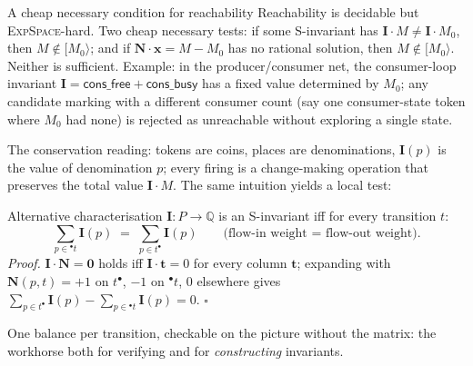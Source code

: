 \begin{notebox}{A cheap necessary condition for reachability}
Reachability is decidable but \textsc{ExpSpace}-hard. Two cheap necessary tests: if some S-invariant has $\mathbf{I} \cdot M \neq \mathbf{I} \cdot M_0$, then $M \notin [M_0\rangle$; and if $\mathbf{N} \cdot \mathbf{x} = M - M_0$ has no rational solution, then $M \notin [M_0\rangle$. Neither is sufficient. Example: in the producer/consumer net, the consumer-loop invariant $\mathbf{I} = \textsf{cons\_free} + \textsf{cons\_busy}$ has a fixed value determined by $M_0$; any candidate marking with a different consumer count (say one consumer-state token where $M_0$ had none) is rejected as unreachable without exploring a single state.
\end{notebox}

The conservation reading: tokens are coins, places are denominations, $\mathbf{I}(p)$ is the value of denomination $p$; every firing is a change-making operation that preserves the total value $\mathbf{I} \cdot M$. The same intuition yields a local test:

\begin{notebox}{Alternative characterisation}
$\mathbf{I} : P \to \mathbb{Q}$ is an S-invariant iff for every transition $t$:
\[
  \sum_{p \in {}^\bullet t} \mathbf{I}(p) \;=\; \sum_{p \in t^\bullet} \mathbf{I}(p)
  \qquad \text{(flow-in weight = flow-out weight)}.
\]
\textit{Proof.} $\mathbf{I} \cdot \mathbf{N} = \mathbf{0}$ holds iff $\mathbf{I} \cdot \mathbf{t} = 0$ for every column $\mathbf{t}$; expanding with $\mathbf{N}(p,t) = +1$ on $t^\bullet$, $-1$ on ${}^\bullet t$, $0$ elsewhere gives $\sum_{p \in t^\bullet} \mathbf{I}(p) - \sum_{p \in {}^\bullet t} \mathbf{I}(p) = 0$. \hfill$\square$
\par\smallskip
One balance per transition, checkable on the picture without the matrix: the workhorse both for verifying and for \emph{constructing} invariants.
\end{notebox}

